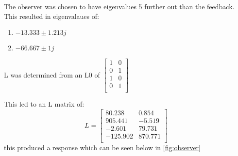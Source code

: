 The observer was chosen to have eigenvalues 5 further out than the feedback. This resulted in eigenvalaues of:\begin{enumerate}
\item$-13.333 \pm 1.213j$\\
\item$-66.667 \pm 1j$\end{enumerate}
L was determined from an L0 of $\begin{bmatrix}
1&0\\
0&1\\
1&0\\
0&1\\
\end{bmatrix}
$

This led to an L matrix of: \begin{equation}L = \begin{bmatrix}
80.238&0.854\\
905.441&-5.519\\
-2.601&79.731\\
-125.902&870.771\\
\end{bmatrix}
\end{equation}this produced a response which can be seen below in \autoref{fig:observer}
